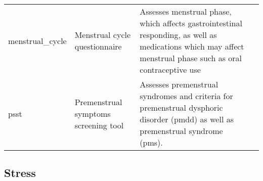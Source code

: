 \documentclass[]{book}
\begin{document}
\begin{longtable}[]{@{}llll@{}}
\begin{minipage}[t]{0.22\columnwidth}
menstrual\_cycle\strut
\end{minipage} & \begin{minipage}[t]{0.27\columnwidth}\raggedright
Menstrual cycle questionnaire\strut
\end{minipage} & \begin{minipage}[t]{0.22\columnwidth}\raggedright
Assesses menstrual phase, which affects gastrointestinal responding, as well as medications which may affect menstrual phase such as oral contraceptive use\strut
\end{minipage} & \begin{minipage}[t]{0.18\columnwidth}\raggedright
\strut
\end{minipage}\tabularnewline
\begin{minipage}[t]{0.22\columnwidth}\raggedright
psst\strut
\end{minipage} & \begin{minipage}[t]{0.27\columnwidth}\raggedright
Premenstrual symptoms screening tool\strut
\end{minipage} & \begin{minipage}[t]{0.22\columnwidth}\raggedright
Assesses premenstrual syndromes and criteria for premenstrual dysphoric disorder (pmdd) as well as premenstrual syndrome (pms).\strut
\end{minipage} & \begin{minipage}[t]{0.18\columnwidth}\raggedright
\strut
\end{minipage}\tabularnewline
\bottomrule
\end{longtable}

\hypertarget{stress}{%
\subsection{Stress}\label{stress}}
\end{document}
